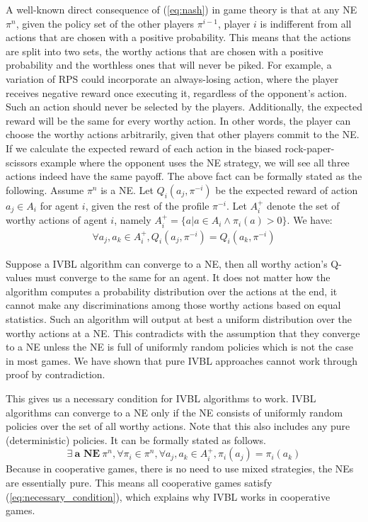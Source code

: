 \documentclass[]{interact}
\theoremstyle{plain}%
\theoremstyle{definition}
\theoremstyle{remark}
\begin{document}
A well-known direct consequence of (\ref{eq:nash}) in game theory is that at any NE $\pi^n$, given the policy set of the other players $\pi^{i-1}$, player $i$ is indifferent from all actions that are chosen with a positive probability. This means that the actions are split into two sets, the worthy actions that are chosen with a positive probability and the worthless ones that will never be piked. For example, a variation of RPS could incorporate an always-losing action, where the player receives negative reward once executing it, regardless of the opponent’s action. Such an action should never be selected by the players. Additionally, the expected reward will be the same for every worthy action. In other words, the player can choose the worthy actions arbitrarily, given that other players commit to the NE. If we calculate the expected reward of each action in the biased rock-paper-scissors example where the opponent uses the NE strategy, we will see all three actions indeed have the same payoff. The above fact can be formally stated as the following. Assume $\pi^n$ is a NE. Let $Q_i(a_j, \pi^{-i})$ be the expected reward of action $a_j \in A_i$ for agent $i$, given the rest of the profile $\pi^{-i}$. Let $A^+_i$ denote the set of worthy actions of agent $i$, namely $A^+_i = \{a | a \in A_i \wedge \pi_i(a) > 0 \}$. We have:
\begin{equation}
    \begin{aligned}
    \forall a_j, a_k \in A^+_i, Q_i(a_j, \pi^{-i}) = Q_i(a_k, \pi^{-i})
    \label{eq:nash_indifferent}
    \end{aligned}
\end{equation}

Suppose a IVBL algorithm can converge to a NE, then all worthy action's Q-values must converge to the same for an agent. It does not matter how the algorithm computes a probability distribution over the actions at the end, it cannot make any discriminations among those worthy actions based on equal statistics. Such an algorithm will output at best a uniform distribution over the worthy actions at a NE. This contradicts with the assumption that they converge to a NE unless the NE is full of uniformly random policies which is not the case in most games. We have shown that pure IVBL approaches cannot work through proof by contradiction.

This gives us a necessary condition for IVBL algorithms to work. IVBL algorithms can converge to a NE only if the NE consists of uniformly random policies over the set of all worthy actions. Note that this also includes any pure (deterministic) policies. It can be formally stated as follows.
\begin{equation}
    \exists \ \textbf{a NE} \ \pi^n, \forall \pi_i \in \pi^n, \forall a_j, a_k \in A^+_i, \pi_i(a_j) = \pi_i(a_k)
    \label{eq:necessary_condition}
\end{equation}
Because in cooperative games, there is no need to use mixed strategies, the NEs are essentially pure. This means all cooperative games satisfy (\ref{eq:necessary_condition}), which explains why IVBL works in cooperative games.
\end{document}
